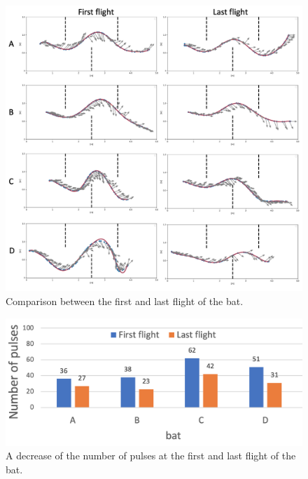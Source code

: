 \documentclass[../main]{subfiles}
\begin{document}
\newpage
{}
\begin{figure}[H]
  \centering
  \vfill
  \includegraphics[width=14cm]{figures/bat_trajectories.png}
  \caption{
    Comparison between the first and last flight of the bat.
  }\label{fig:bat_trajectories}
\end{figure}

\newpage
{}
\begin{figure}[H]
  \centering
  \vfill
  \includegraphics[width=13cm]{figures/bat_pulses.png}
  \caption{
    A decrease of the number of pulses at the first and last 
    flight of the bat.
  }\label{fig:bat_pulse}
\end{figure}
\end{document}
